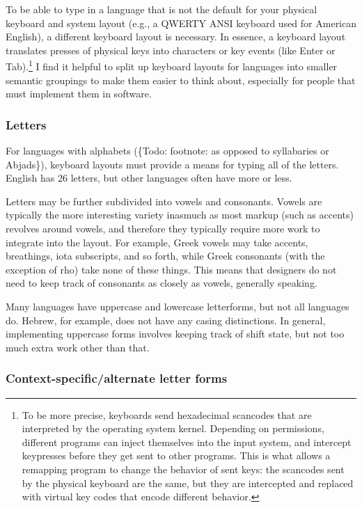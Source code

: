\documentclass[11pt]{article}
\begin{document}
To be able to type in a language that is not the default for your physical keyboard and system layout (e.g., a QWERTY ANSI keyboard used for American English), a different keyboard layout is necessary. In essence, a keyboard layout translates presses of physical keys into characters or key events (like Enter or Tab).\footnote{To be more precise, keyboards send hexadecimal scancodes that are interpreted by the operating system kernel. Depending on permissions, different programs can inject themselves into the input system, and intercept keypresses before they get sent to other programs. This is what allows a remapping program to change the behavior of sent keys: the scancodes sent by the physical keyboard are the same, but they are intercepted and replaced with virtual key codes that encode different behavior.} I find it helpful to split up keyboard layouts for languages into smaller semantic groupings to make them easier to think about, especially for people that must implement them in software.

\subsubsection{Letters}
\label{sec:org07b3468}

For languages with alphabets (\{Todo: footnote: as opposed to syllabaries or Abjads\}), keyboard layouts must provide a means for typing all of the letters. English has 26 letters, but other languages often have more or less.

Letters may be further subdivided into vowels and consonants. Vowels are typically the more interesting variety inasmuch as most markup (such as accents) revolves around vowels, and therefore they typically require more work to integrate into the layout. For example, Greek vowels may take accents, breathings, iota subscripts, and so forth, while Greek consonants (with the exception of rho) take none of these things. This means that designers do not need to keep track of consonants as closely as vowels, generally speaking.

Many languages have uppercase and lowercase letterforms, but not all languages do. Hebrew, for example, does not have any casing distinctions. In general, implementing uppercase forms involves keeping track of shift state, but not too much extra work other than that.

\subsubsection{Context-specific/alternate letter forms}
\label{sec:org51490e1}
\end{document}
